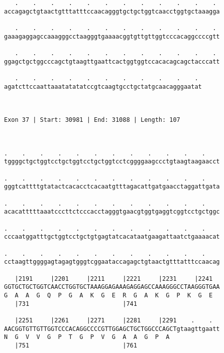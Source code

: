 \documentclass{article}
\begin{document}
\begin{Verbatim}
   .    .    .    .    .    .    .    .    .    .    .    . 
accagagctgtaactgtttatttccaacagggtgctgctggtcaacctggtgctaaagga
                                                            
   .    .    .    .    .    .    .    .    .    .    .    . 
gaaagaggagccaaagggcctaagggtgaaaacggtgttgttggtcccacaggccccgtt
                                                            
   .    .    .    .    .    .    .    .    .    .    .    . 
ggagctgctggcccagctgtaagttgaattcactggtggtccacacagcagctacccatt
                                                            
   .    .    .    .    .    .    .    .    .    .    . 
agatcttccaattaaatatatatccgtcaagtgcctgctatgcaacagggaatat
                                                       
                                                       
 
Exon 37 | Start: 30981 | End: 31088 | Length: 107



.    .    .    .    .    .    .    .    .    .    .    .    
tggggctgctggtcctgctggtcctgctggtcctcggggaagccctgtaagtaagaacct
                                                            
.    .    .    .    .    .    .    .    .    .    .    .    
gggtcattttgtatactcacacctcacaatgtttagacattgatgaacctaggattgata
                                                            
.    .    .    .    .    .    .    .    .    .    .    .    
acacatttttaaatcccttctcccacctagggtgaacgtggtgaggtcggtcctgctggc
                                                            
.    .    .    .    .    .    .    .    .    .    .    .    
cccaatggatttgctggtcctgctgtgagtatcacataatgaagattaatctgaaaacat
                                                            
.    .    .    .    .    .    .    .    .    .    .    .    
cctaagttggggagtagagtgggtcggaataccagagctgtaactgtttatttccaacag
                                                            
   |2191     |2201     |2211     |2221     |2231     |2241  
GGTGCTGCTGGTCAACCTGGTGCTAAAGGAGAAAGAGGAGCCAAAGGGCCTAAGGGTGAA
G  A  A  G  Q  P  G  A  K  G  E  R  G  A  K  G  P  K  G  E  
   |731                          |741                       
  
   |2251     |2261     |2271     |2281     |2291    .    .  
AACGGTGTTGTTGGTCCCACAGGCCCCGTTGGAGCTGCTGGCCCAGCTgtaagttgaatt
N  G  V  V  G  P  T  G  P  V  G  A  A  G  P  A              
   |751                          |761                       
  

\end{Verbatim}
\end{document}
